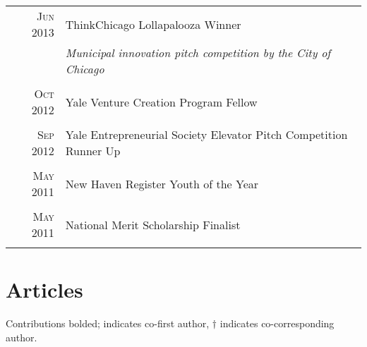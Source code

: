 \documentclass[a4paper,10pt]{article}
\begin{document}
\begin{tabular}{rp{11cm}}
 \textsc{Jun} 2013 & ThinkChicago Lollapalooza Winner \\
 							    & \small\emph{Municipal innovation pitch competition by the City of Chicago} \\
 \multicolumn{2}{c}{} \\
 \textsc{Oct} 2012 & Yale Venture Creation Program Fellow \\
 \multicolumn{2}{c}{} \\	
 \textsc{Sep} 2012 & Yale Entrepreneurial Society Elevator Pitch Competition Runner Up \\
 \multicolumn{2}{c}{} \\
 \textsc{May} 2011 & New Haven Register Youth of the Year \\
 \multicolumn{2}{c}{} \\
 \textsc{May} 2011 & National Merit Scholarship Finalist \\
 \multicolumn{2}{c}{} \\
\end{tabular}

\section{Articles}
Contributions bolded; {\bf *} indicates co-first author, {\bf $\dag$} indicates co-corresponding author. 
\end{document}
